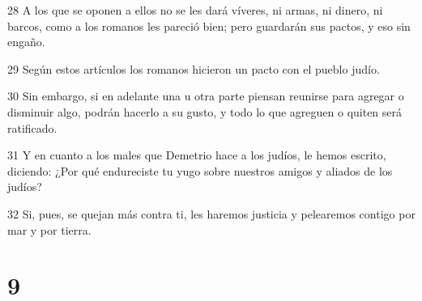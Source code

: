 \par 28 A los que se oponen a ellos no se les dará víveres, ni armas, ni dinero, ni barcos, como a los romanos les pareció bien; pero guardarán sus pactos, y eso sin engaño.
\par 29 Según estos artículos los romanos hicieron un pacto con el pueblo judío.
\par 30 Sin embargo, si en adelante una u otra parte piensan reunirse para agregar o disminuir algo, podrán hacerlo a su gusto, y todo lo que agreguen o quiten será ratificado.
\par 31 Y en cuanto a los males que Demetrio hace a los judíos, le hemos escrito, diciendo: ¿Por qué endureciste tu yugo sobre nuestros amigos y aliados de los judíos?
\par 32 Si, pues, se quejan más contra ti, les haremos justicia y pelearemos contigo por mar y por tierra.

\chapter{9}

